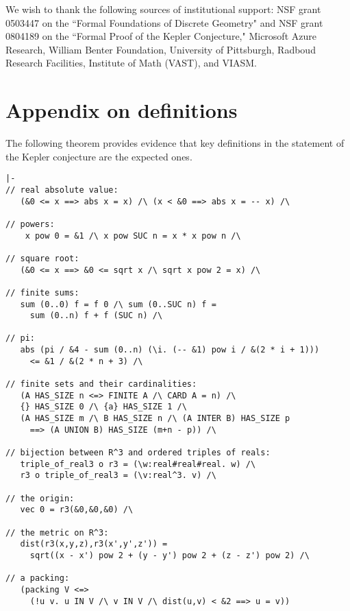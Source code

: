 We wish to thank the following sources of institutional support: NSF
grant 0503447 on the ``Formal Foundations of Discrete Geometry" and NSF
grant 0804189 on the ``Formal Proof of the Kepler Conjecture,"
Microsoft Azure Research, William Benter Foundation, University of
Pittsburgh, Radboud Research Facilities, Institute of Math (VAST), and
VIASM.


\section{Appendix on definitions}\label{sec:ap}

The following theorem provides evidence that key definitions in the
statement of the Kepler conjecture are the expected ones.

\begin{obeylines}

\begin{verbatim}
|-  
// real absolute value:
   (&0 <= x ==> abs x = x) /\ (x < &0 ==> abs x = -- x) /\   

// powers:
    x pow 0 = &1 /\ x pow SUC n = x * x pow n /\

// square root:
   (&0 <= x ==> &0 <= sqrt x /\ sqrt x pow 2 = x) /\ 

// finite sums:
   sum (0..0) f = f 0 /\ sum (0..SUC n) f =  
     sum (0..n) f + f (SUC n) /\ 

// pi:
   abs (pi / &4 - sum (0..n) (\i. (-- &1) pow i / &(2 * i + 1))) 
     <= &1 / &(2 * n + 3) /\

// finite sets and their cardinalities:
   (A HAS_SIZE n <=> FINITE A /\ CARD A = n) /\
   {} HAS_SIZE 0 /\ {a} HAS_SIZE 1 /\ 
   (A HAS_SIZE m /\ B HAS_SIZE n /\ (A INTER B) HAS_SIZE p 
     ==> (A UNION B) HAS_SIZE (m+n - p)) /\

// bijection between R^3 and ordered triples of reals:
   triple_of_real3 o r3 = (\w:real#real#real. w) /\
   r3 o triple_of_real3 = (\v:real^3. v) /\ 

// the origin:
   vec 0 = r3(&0,&0,&0) /\

// the metric on R^3:
   dist(r3(x,y,z),r3(x',y',z')) = 
     sqrt((x - x') pow 2 + (y - y') pow 2 + (z - z') pow 2) /\

// a packing:
   (packing V <=> 
     (!u v. u IN V /\ v IN V /\ dist(u,v) < &2 ==> u = v))
\end{verbatim}

\end{obeylines}





